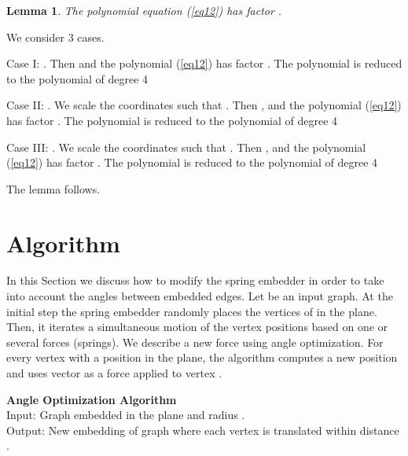 \documentclass[10pt]{article}
\newtheorem{lemma}[theorem]{Lemma}
\newenvironment{proof}{\begingroup\Proof}{\qed\endgroup}
\def\Proof{\noindent{\bf Proof\/:}\nobreak}
\def\qed{\unskip~{\vrule height 4pt depth 0pt width 4pt}\medbreak}
\begin{document}
\begin{lemma} \label{factor}
The polynomial equation (\ref{eq12}) has factor .
\end{lemma}

\begin{proof}
We consider 3 cases.

Case I: .
Then  and the polynomial (\ref{eq12}) 
has factor . The polynomial is reduced to the polynomial of degree 4


Case II: .
We scale the coordinates such that .
Then  ,  and the polynomial (\ref{eq12}) 
has factor . The polynomial is reduced to the polynomial of degree 4



Case III: .
We scale the coordinates such that .
Then  ,  and the polynomial (\ref{eq12}) 
has factor . The polynomial is reduced to the polynomial of degree 4

The lemma follows.
\end{proof}











\section{Algorithm} \label{algorithm}

In this Section we discuss how to modify the spring embedder in order to take into account 
the angles between embedded edges. 
Let  be an input graph. 
At the initial step the spring embedder randomly places the vertices of  in the plane.
Then, it iterates a simultaneous motion of the vertex positions based on
one or several forces (springs). 
We describe a new force using angle optimization.
For every vertex  with a position  in the plane, the algorithm computes 
a new position  and uses vector  as a force applied to vertex .




{\bf Angle Optimization Algorithm}\\
Input: Graph  embedded in the plane and radius .\\
Output: New embedding of graph  where each vertex is translated within distance .
\end{document}
